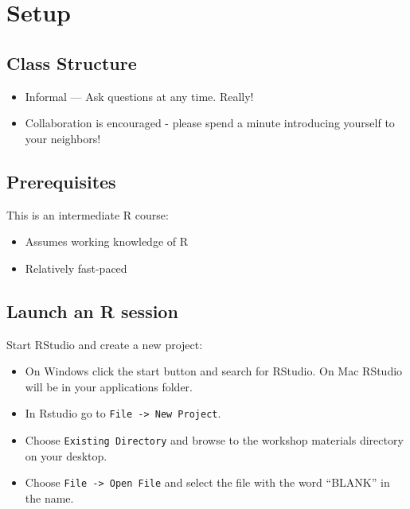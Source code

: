 \documentclass[]{book}
\providecommand{\tightlist}{%
  \setlength{\itemsep}{0pt}\setlength{\parskip}{0pt}}
\begin{document}
\section{Setup}\label{setup-2}

\subsection{Class Structure}\label{class-structure-2}

\begin{itemize}
\tightlist
\item
  Informal --- Ask questions at any time. Really!
\item
  Collaboration is encouraged - please spend a minute introducing
  yourself to your neighbors!
\end{itemize}

\subsection{Prerequisites}\label{prerequisites-2}

This is an intermediate R course:

\begin{itemize}
\tightlist
\item
  Assumes working knowledge of R
\item
  Relatively fast-paced
\end{itemize}

\subsection{Launch an R session}\label{launch-an-r-session-1}

Start RStudio and create a new project:

\begin{itemize}
\tightlist
\item
  On Windows click the start button and search for RStudio. On Mac
  RStudio will be in your applications folder.
\item
  In Rstudio go to \texttt{File\ -\textgreater{}\ New\ Project}.
\item
  Choose \texttt{Existing\ Directory} and browse to the workshop
  materials directory on your desktop.
\item
  Choose \texttt{File\ -\textgreater{}\ Open\ File} and select the file
  with the word ``BLANK'' in the name.
\end{itemize}
\end{document}
